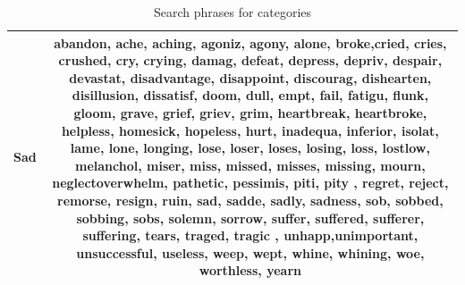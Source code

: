 \documentclass[11pt]{article}
\begin{document}
\begin{table}
\begin{tabulary}{500pt}{|C|C|}
   Sad                                   & abandon, ache, aching, agoniz, agony, alone, broke,cried, cries, crushed, cry, crying, damag, defeat, depress, depriv, despair, devastat, disadvantage, disappoint, discourag, dishearten, disillusion, dissatisf, doom, dull, empt, fail, fatigu, flunk, gloom, grave, grief, griev, grim, heartbreak, heartbroke, helpless, homesick, hopeless, hurt, inadequa, inferior, isolat, lame, lone, longing, lose, loser, loses, losing, loss, lostlow, melanchol, miser, miss, missed, misses, missing, mourn, neglectoverwhelm, pathetic, pessimis, piti, pity , regret, reject, remorse, resign, ruin, sad, sadde, sadly, sadness, sob, sobbed, sobbing, sobs, solemn, sorrow, suffer, suffered, sufferer, suffering, tears, traged, tragic , unhapp,unimportant, unsuccessful, useless, weep, wept, whine, whining, woe, worthless, yearn \\ \hline

  
    \end{tabulary}
\caption{Search phrases for categories}
  \label{Table:1}
\end{table}
\end{document}
